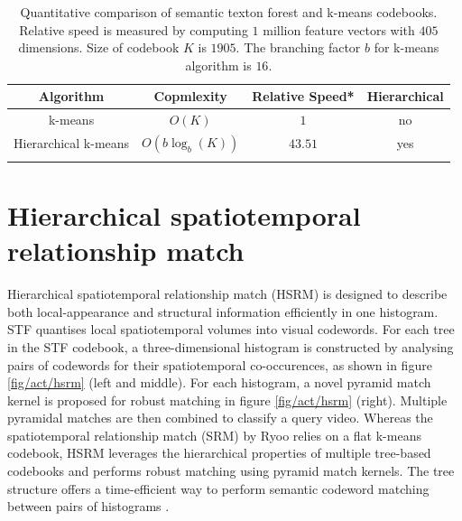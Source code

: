 \begin{table}
	\begin{center}
		\begin{tabular}{|c|c|c|c|}
			\hline
			\textbf{ Algorithm} & \textbf{ Copmlexity} & \textbf{ Relative Speed}* & \textbf{ Hierarchical} \\
			\hline
			k-means & $O(K)$ & $1$ & no \\
			Hierarchical k-means & $O(b\log_{b}(K))$ & $43.51$ & yes \\
			{\color{blue}{STF}} & {\color{blue}{ $ O(\log_{2}(K)) $ }} & {\color{blue}{$559.86$}} & {\color{blue}{yes}}\\
			\hline
		\end{tabular}
	\end{center}
	\caption{Quantitative comparison of semantic texton forest and k-means codebooks. Relative speed is measured by computing $1$ million feature vectors with $405$ dimensions. Size of codebook $K$ is $1905$. The branching factor $b$ for k-means algorithm is $16$.}
	\label{tab/act/codebook}
\end{table}

\section{Hierarchical spatiotemporal relationship match}
\label{sec/act/HSRM}

Hierarchical spatiotemporal relationship match (HSRM) is designed to describe both local-appearance and structural information efficiently in one histogram. 
STF quantises local spatiotemporal volumes into visual codewords. 
For each tree in the STF codebook, a three-dimensional histogram is constructed by analysing pairs of codewords for their spatiotemporal co-occurences, as shown in figure \ref{fig/act/hsrm} (left and middle). 
For each histogram, a novel pyramid match kernel is proposed for robust matching in figure \ref{fig/act/hsrm} (right). 
Multiple pyramidal matches are then combined to classify a query video. 
Whereas the spatiotemporal relationship match (SRM) by Ryoo \etal \cite{Ryoo2009} relies on a flat k-means codebook, HSRM leverages the hierarchical properties of multiple tree-based codebooks and performs robust matching using pyramid match kernels. The tree structure offers a time-efficient way to perform semantic codeword matching between pairs of histograms \cite{Grauman2005}.


